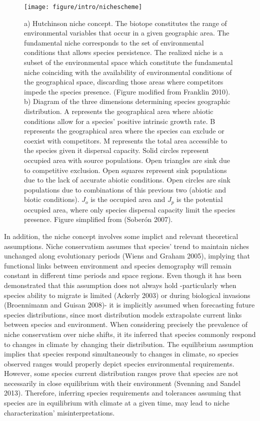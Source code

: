 \documentclass[11pt,twoside]{reedthesis}
\begin{document}
\setlength{\abovecaptionskip}{-30pt}
\begin{figure}[hbt!]

{\centering \texttt{[image: figure/intro/nichescheme]} 

}

\caption[Graphical representation of fundamental and realized niches according to Franklin 2010 and Soberón 2007]{a) Hutchinson niche concept. The biotope constitutes the range of environmental variables that occur in a given geographic area. The fundamental niche corresponds to the set of environmental conditions that allows species persistence. The realized niche is a subset of the environmental space which constitute the fundamental niche coinciding with the availability of environmental conditions of the geographical space, discarding those areas where competitors impede the species presence. (Figure modified from Franklin 2010). b) Diagram of the three dimensions determining species geographic distribution. A represents the geographical area where abiotic conditions allow for a species’ positive intrinsic growth rate. B represents the geographical area where the species can exclude or coexist with competitors. M represents the total area accessible to the species given it dispersal capacity. Solid circles represent occupied area with source populations. Open triangles are sink due to competitive exclusion. Open squares represent sink populations due to the lack of accurate abiotic conditions. Open circles are sink populations due to combinations of this previous two (abiotic and biotic conditions). $J_o$ is the occupied area and $J_p$ is the potential occupied area, where only species dispersal capacity limit the species presence. Figure simplified from (Soberón 2007).}\label{fig:introplot1}
\end{figure}
In addition, the niche concept involves some implict and relevant
theoretical assumptions. Niche conservatism assumes that species' trend
to maintain niches unchanged along evolutionary periods (Wiens and
Graham 2005), implying that functional links between environment and
species demography will remain constant in different time periods and
space regions. Even though it has been demonstrated that this assumption
does not always hold -particularly when species ability to migrate is
limited (Ackerly 2003) or during biological invasions (Broennimann and
Guisan 2008)- it is implicitly assumed when forecasting future species
distributions, since most distribution models extrapolate current links
between species and environment. When considering precisely the
prevalence of niche conservatism over niche shifts, it its inferred that
species commonly respond to changes in climate by changing their
distribution. The equilibrium assumption implies that species respond
simultaneously to changes in climate, so species observed ranges would
properly depict species environmental requirements. However, some
species current distribution ranges prove that species are not
necessarily in close equilibrium with their environment (Svenning and
Sandel 2013). Therefore, inferring species requirements and tolerances
assuming that species are in equilibrium with climate at a given time,
may lead to niche characterization' misinterpretations.\par
\end{document}
